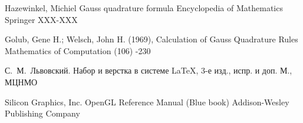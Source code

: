 \begin{thebibliography}{2013}
\label{gauss_book}
 \by Hazewinkel, Michiel
 \paper Gauss quadrature formula
 \jour Encyclopedia of Mathematics
 \publaddr Springer
 \pages XXX-XXX
 
\label{gauss_article}
  \by Golub, Gene H.; Welsch, John H. (1969), 
  \paper Calculation of Gauss Quadrature Rules
  \jour Mathematics of Computation
   (106)
  -230

\by С.~М.~Львовский.
\book Набор и верстка в системе \LaTeX, 3-е изд., испр. и доп.
\publaddr М., МЦНМО

\label{opengl-manual}
 \by Silicon Graphics, Inc.
 \book OpenGL Reference Manual (Blue book)
 \publ Addison-Wesley Publishing Company


\end{thebibliography}

\endinput
